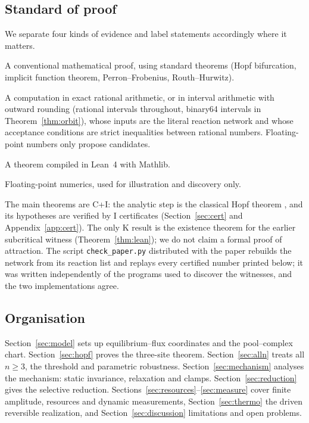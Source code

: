 \documentclass[11pt,a4paper]{article}
\theoremstyle{plain}
\theoremstyle{definition}
\theoremstyle{remark}
\newcommand{\evC}{\textsf{C}}
\newcommand{\evI}{\textsf{I}}
\newcommand{\evK}{\textsf{K}}
\newcommand{\evN}{\textsf{N}}
\begin{document}
\subsection{Standard of proof}\label{sec:evidence}
We separate four kinds of evidence and label statements accordingly where it matters.
\begin{description}[leftmargin=2.2em,labelwidth=1.4em,labelsep=0.4em,itemsep=1pt]
\item[\evC] A conventional mathematical proof, using standard theorems (Hopf bifurcation, implicit function theorem, Perron--Frobenius, Routh--Hurwitz).
\item[\evI] A computation in exact rational arithmetic, or in interval arithmetic with outward rounding (rational intervals throughout, binary64 intervals in Theorem~\ref{thm:orbit}), whose inputs are the literal reaction network and whose acceptance conditions are strict inequalities between rational numbers. Floating-point numbers only propose candidates.
\item[\evK] A theorem compiled in Lean~4 with Mathlib.
\item[\evN] Floating-point numerics, used for illustration and discovery only.
\end{description}
The main theorems are \evC+\evI: the analytic step is the classical Hopf theorem \cite{Kuznetsov23,HassardKazarinoffWan81,MarsdenMcCracken76}, and its hypotheses are verified by \evI{} certificates (Section~\ref{sec:cert} and Appendix~\ref{app:cert}). The only \evK{} result is the existence theorem for the earlier subcritical witness (Theorem~\ref{thm:lean}); we do not claim a formal proof of attraction. The script \texttt{check\_paper.py} distributed with the paper rebuilds the network from its reaction list and replays every certified number printed below; it was written independently of the programs used to discover the witnesses, and the two implementations agree.

\subsection{Organisation}
Section~\ref{sec:model} sets up equilibrium--flux coordinates and the pool--complex chart. Section~\ref{sec:hopf} proves the three-site theorem. Section~\ref{sec:alln} treats all $n\ge3$, the threshold and parametric robustness. Section~\ref{sec:mechanism} analyses the mechanism: static invariance, relaxation and clamps. Section~\ref{sec:reduction} gives the selective reduction. Sections~\ref{sec:resources}--\ref{sec:measure} cover finite amplitude, resources and dynamic measurements, Section~\ref{sec:thermo} the driven reversible realization, and Section~\ref{sec:discussion} limitations and open problems.
\end{document}
